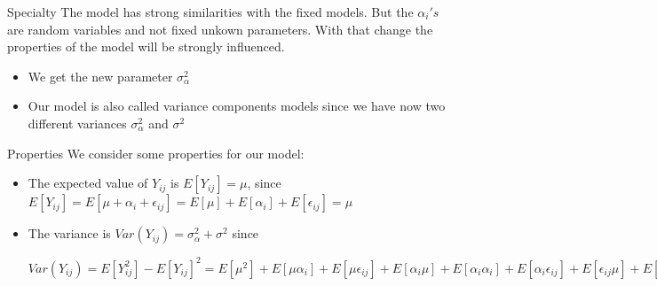 \documentclass[unknownkeysallowed]{beamer}
\begin{document}
\begin{frame}{Specialty}
    The model has strong similarities with the fixed models. But the $\alpha_i's$ are random variables and not fixed unkown parameters.
    With that change the properties of the model will be strongly influenced.
    \begin{itemize}
        \item We get the new parameter $\sigma^2_{\alpha}$
        \item Our model is also called variance components models since we have now two different variances $\sigma^2_{\alpha}$ and $\sigma^2$
    \end{itemize}
\end{frame}

\begin{frame}{Properties}
    We consider some properties for our model:
    \begin{itemize}
        \item The expected value of $Y_{ij}$ is $E[Y_{ij}]=\mu$, since $E[Y_{ij}] = E[\mu + \alpha_i + \epsilon_{ij}] = E[\mu] + E[\alpha_i] + E[\epsilon_{ij}] = \mu$
        \item The variance is $Var(Y_{ij}) = \sigma^2_{\alpha} +\sigma^2$ since
        
        $Var(Y_{ij}) = E[Y_{ij}^2] - E[Y_{ij}]^2
        = E[\mu^2] + E[\mu \alpha_i] + E[\mu \epsilon_{ij}] + E[\alpha_i \mu] + E[\alpha_i \alpha_i] + E[\alpha_i \epsilon_{ij}] + E[\epsilon_{ij} \mu] + E[\epsilon_{ij}\alpha_i] + E[\epsilon_{ij}\epsilon_{ij}] - \mu^2
        = \mu^2 + \mu \underbrace{E[\alpha_i]}_\text{= 0} + \mu \underbrace{E[\epsilon_{ij}]}_\text{= 0} + \underbrace{E[\alpha_i]}_\text{=0}\mu + E[\alpha_i^2] + \underbrace{E[\alpha_i]}_\text{= 0}\underbrace{E[\epsilon_{ij}]}_\text{= 0} + \underbrace{E[\epsilon_{ij}]}_\text{=0}\mu + \underbrace{E[\epsilon_{ij}]}_\text{=0} \underbrace{E[\alpha_i]}_\text{=0} + E[\epsilon_{ij}^2] - \mu^2 
        = E[\alpha_i^2] + E[\epsilon_{ij}^2]
        = \sigma^2_{\alpha} + \sigma^2$
    \end{itemize}
\end{frame}
\end{document}

